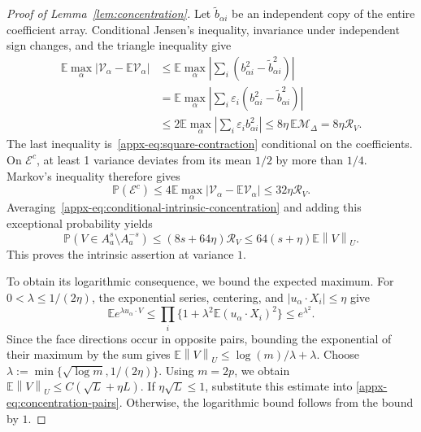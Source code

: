 \documentclass[11pt,letterpaper]{article}
\theoremstyle{remark}
\newcommand{\E}{\mathbb E}
\newcommand{\Pp}{\mathbb P}
\newcommand{\norm}[1]{\left\lVert#1\right\rVert}
\begin{document}
\begin{proof}[Proof of Lemma~\ref{lem:concentration}]
Let \(\widetilde b_{\alpha i}\) be an independent copy of the entire
coefficient array. Conditional Jensen's inequality, invariance under
independent sign changes, and the triangle inequality give
\begin{align*}
 \E\max_\alpha|{\mathcal V_\alpha}-\E {\mathcal V_\alpha}|
 &\le\E\max_\alpha
       \left|\sum_i(b_{\alpha i}^2-\widetilde b_{\alpha i}^2)\right|\\
 &=\E\max_\alpha
       \left|\sum_i\varepsilon_i
                  (b_{\alpha i}^2-\widetilde b_{\alpha i}^2)\right|\\
 &\le2\E\max_\alpha\left|\sum_i\varepsilon_i b_{\alpha i}^2\right|
 \le8\eta\,\E\mathcal M_\Delta
 =8\eta\mathcal R_V.
\end{align*}
The last inequality is~\eqref{appx-eq:square-contraction}
conditional on the coefficients. On \(\mathcal E^c\), at least
1 variance deviates from its mean \(1/2\) by more than \(1/4\).
Markov's inequality therefore gives
\begin{equation}
 \Pp(\mathcal E^c)
 \le4\E\max_\alpha|{\mathcal V_\alpha}-\E {\mathcal V_\alpha}|
 \le32\eta\mathcal R_V.
 \label{appx-eq:conditional-variance}
\end{equation}
Averaging~\eqref{appx-eq:conditional-intrinsic-concentration} and
adding this exceptional probability yields
\begin{equation}
 \Pp(V\in A_a^s\setminus A_a^{-s})
 \le(8s+64\eta)\mathcal R_V
 \le64(s+\eta)\E\norm{V}_U.
 \label{appx-eq:concentration-pairs}
\end{equation}
This proves the intrinsic assertion at variance \(1\).

To obtain its logarithmic consequence, we bound the expected maximum.
For \(0<\lambda\le1/(2\eta)\), the exponential series, centering,
and \(|u_\alpha\cdot X_i|\le\eta\) give
\[
 \E e^{\lambda u_\alpha\cdot V}
 \le\prod_i\{1+\lambda^2\E(u_\alpha\cdot X_i)^2\}
 \le e^{\lambda^2}.
\]
Since the face directions occur in opposite pairs, bounding the
exponential of their maximum by the sum gives
\(\E\norm{V}_U\le\log(m)/\lambda+\lambda\).
Choose \(\lambda:=\min\{\sqrt{\log m},1/(2\eta)\}\).
Using \(m=2p\), we obtain
\(\E\norm{V}_U\le C(\sqrt L+\eta L)\).
If \(\eta\sqrt L\le1\), substitute this estimate into
\eqref{appx-eq:concentration-pairs}. Otherwise, the logarithmic bound
follows from the bound by \(1\).


\end{proof}
\end{document}

